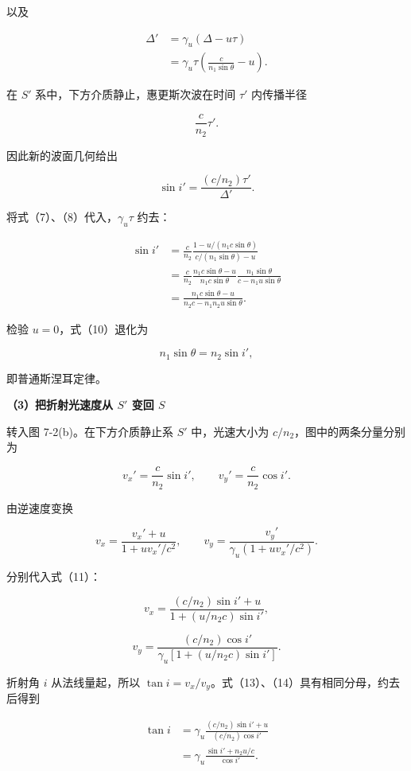 \documentclass[12pt,a4paper,UTF8]{ctexart}
\begin{document}
以及

\[
\begin{aligned}
\Delta'
&=\gamma_u(\Delta-u\tau)\\
&=\gamma_u\tau\left(
\frac{c}{n_1\sin\theta}-u
\right).
\end{aligned}\tag{8}
\]

在 \(S'\) 系中，下方介质静止，惠更斯次波在时间 \(\tau'\) 内传播半径

\[
\frac{c}{n_2}\tau'.
\]

因此新的波面几何给出

\[
\sin i'=\frac{(c/n_2)\tau'}{\Delta'}.
\tag{9}
\]

将式（7）、（8）代入，\(\gamma_u\tau\) 约去：

\[
\begin{aligned}
\sin i'
&=\frac{c}{n_2}
\frac{1-u/(n_1c\sin\theta)}
{c/(n_1\sin\theta)-u}\\
&=\frac{c}{n_2}
\frac{n_1c\sin\theta-u}
{n_1c\sin\theta}
\frac{n_1\sin\theta}
{c-n_1u\sin\theta}\\
&=\boxed{
\frac{n_1c\sin\theta-u}
{n_2c-n_1n_2u\sin\theta}
}.
\end{aligned}\tag{10}
\]

检验 \(u=0\)，式（10）退化为

\[
n_1\sin\theta=n_2\sin i',
\]

即普通斯涅耳定律。

\textbf{（3）把折射光速度从 \(S'\) 变回 \(S\)}

转入图 7-2(b)。在下方介质静止系 \(S'\) 中，光速大小为
\(c/n_2\)，图中的两条分量分别为

\[
v_x'=\frac{c}{n_2}\sin i',\qquad
v_y'=\frac{c}{n_2}\cos i'.
\tag{11}
\]

由逆速度变换

\[
v_x=\frac{v_x'+u}{1+uv_x'/c^2},\qquad
v_y=\frac{v_y'}{\gamma_u(1+uv_x'/c^2)}.
\tag{12}
\]

分别代入式（11）：

\[
v_x=\frac{(c/n_2)\sin i'+u}
{1+(u/n_2c)\sin i'},
\tag{13}
\]

\[
v_y=\frac{(c/n_2)\cos i'}
{\gamma_u[1+(u/n_2c)\sin i']}.
\tag{14}
\]

折射角 \(i\) 从法线量起，所以
\(\tan i=v_x/v_y\)。式（13）、（14）具有相同分母，约去后得到

\[
\begin{aligned}
\tan i
&=\gamma_u
\frac{(c/n_2)\sin i'+u}
{(c/n_2)\cos i'}\\
&=\boxed{
\gamma_u\frac{\sin i'+n_2u/c}{\cos i'}
}.
\end{aligned}\tag{15}
\]
\end{document}
